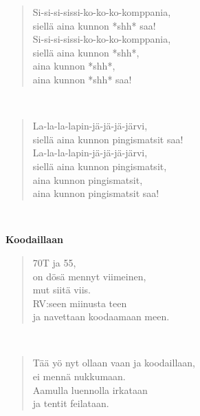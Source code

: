 \noindent\begin{minipage}{\linewidth}
\begin{verse}
	Si-si-si-sissi-ko-ko-ko-komppania,\\
	siellä aina kunnon *shh* saa!\\
	Si-si-si-sissi-ko-ko-ko-komppania,\\
	siellä aina kunnon *shh*,\\
	aina kunnon *shh*,\\
	aina kunnon *shh* saa!\\
\end{verse}
\end{minipage}\\[10pt]
\noindent\begin{minipage}{\linewidth}
\begin{verse}
	La-la-la-lapin-jä-jä-jä-järvi,\\
	siellä aina kunnon pingismatsit saa!\\
	La-la-la-lapin-jä-jä-jä-järvi,\\
	siellä aina kunnon pingismatsit,\\
	aina kunnon pingismatsit,\\
	aina kunnon pingismatsit saa!\\
\end{verse}
\end{minipage}\\[10pt]
%
%
\noindent\begin{minipage}{\linewidth}
\vspace{5pt}
\parbox[t]{0.85\linewidth}{\raggedright {\large\bf Koodaillaan}\\[6pt]}
\begin{verse}
	70T ja 55,\\
	on dösä mennyt viimeinen,\\
	mut siitä viis.\\
	RV:seen miinusta teen\\
	ja navettaan koodaamaan meen.\\
\end{verse}
\end{minipage}\\[10pt]
\noindent\begin{minipage}{\linewidth}
\begin{verse}
	Tää yö nyt ollaan vaan ja koodaillaan,\\
	ei mennä nukkumaan.\\
	Aamulla luennolla irkataan\\
	ja tentit feilataan.\\
\end{verse}
\end{minipage}\\[10pt]
